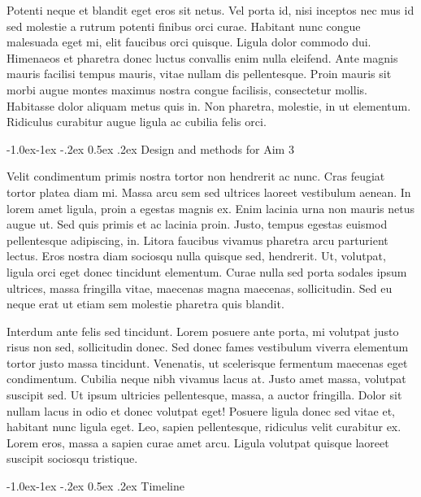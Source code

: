 \documentclass[11pt,]{article}
\makeatletter
\renewcommand\subsubsection{
  \@startsection{subsubsection}{3}{\z@}
    {-1.0ex\@plus -1ex \@minus -.2ex}%
    {0.5ex \@plus .2ex}%
    {\normalfont\normalsize\bf}} %
\makeatother
\begin{document}
Potenti neque et blandit eget eros sit netus. Vel porta id, nisi
inceptos nec mus id sed molestie a rutrum potenti finibus orci curae.
Habitant nunc congue malesuada eget mi, elit faucibus orci quisque.
Ligula dolor commodo dui. Himenaeos et pharetra donec luctus convallis
enim nulla eleifend. Ante magnis mauris facilisi tempus mauris, vitae
nullam dis pellentesque. Proin mauris sit morbi augue montes maximus
nostra congue facilisis, consectetur mollis. Habitasse dolor aliquam
metus quis in. Non pharetra, molestie, in ut elementum. Ridiculus
curabitur augue ligula ac cubilia felis orci.

\hypertarget{design-and-methods-for-aim-3}{%
\subsubsection{Design and methods for Aim
3}\label{design-and-methods-for-aim-3}}

Velit condimentum primis nostra tortor non hendrerit ac nunc. Cras
feugiat tortor platea diam mi. Massa arcu sem sed ultrices laoreet
vestibulum aenean. In lorem amet ligula, proin a egestas magnis ex. Enim
lacinia urna non mauris netus augue ut. Sed quis primis et ac lacinia
proin. Justo, tempus egestas euismod pellentesque adipiscing, in. Litora
faucibus vivamus pharetra arcu parturient lectus. Eros nostra diam
sociosqu nulla quisque sed, hendrerit. Ut, volutpat, ligula orci eget
donec tincidunt elementum. Curae nulla sed porta sodales ipsum ultrices,
massa fringilla vitae, maecenas magna maecenas, sollicitudin. Sed eu
neque erat ut etiam sem molestie pharetra quis blandit.

Interdum ante felis sed tincidunt. Lorem posuere ante porta, mi volutpat
justo risus non sed, sollicitudin donec. Sed donec fames vestibulum
viverra elementum tortor justo massa tincidunt. Venenatis, ut
scelerisque fermentum maecenas eget condimentum. Cubilia neque nibh
vivamus lacus at. Justo amet massa, volutpat suscipit sed. Ut ipsum
ultricies pellentesque, massa, a auctor fringilla. Dolor sit nullam
lacus in odio et donec volutpat eget! Posuere ligula donec sed vitae et,
habitant nunc ligula eget. Leo, sapien pellentesque, ridiculus velit
curabitur ex. Lorem eros, massa a sapien curae amet arcu. Ligula
volutpat quisque laoreet suscipit sociosqu tristique.

\hypertarget{timeline}{%
\subsubsection{Timeline}\label{timeline}}
\end{document}
